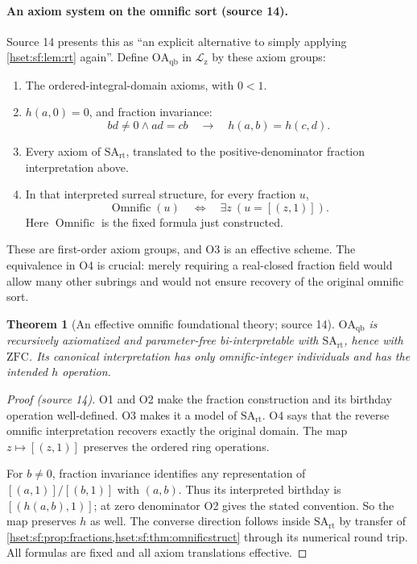 \documentclass[11pt,letterpaper]{article}
\newtheorem{theorem}{Theorem}[section]
\theoremstyle{definition}
\theoremstyle{remark}
\newcommand{\ZFC}{\mathrm{ZFC}}
\newcommand{\Lz}{\mathcal L_{\mathrm z}}
\newcommand{\SArt}{\mathrm{SA}_{\mathrm{rt}}}
\newcommand{\OAqb}{\mathrm{OA}_{\mathrm{qb}}}
\begin{document}
\paragraph{An axiom system on the omnific sort (source 14).} Source 14 presents
this as ``an explicit alternative to simply applying \cref{hset:sf:lem:rt}
again''. Define $\OAqb$ in $\Lz$ by these axiom groups:
\begin{enumerate}[label=\textbf{O\arabic*.}]
\item The ordered-integral-domain axioms, with $0<1$.
\item $h(a,0)=0$, and fraction invariance:
\[
 bd\ne0\land ad=cb\quad\longrightarrow\quad h(a,b)=h(c,d).
\]
\item Every axiom of $\SArt$, translated to the positive-denominator fraction
interpretation above.
\item In that interpreted surreal structure, for every fraction $u$,
\[
 \operatorname{Omnific}(u)\quad\Longleftrightarrow\quad\exists z\ (u=[(z,1)]).
\]
Here $\operatorname{Omnific}$ is the fixed formula just constructed.
\end{enumerate}
These are first-order axiom groups, and O3 is an effective scheme. The equivalence
in O4 is crucial: merely requiring a real-closed fraction field would allow many
other subrings and would not ensure recovery of the original omnific sort.

\begin{theorem}[An effective omnific foundational theory; source 14]\label{hset:sf:thm:omnifictheory}
$\OAqb$ is recursively axiomatized and parameter-free bi-interpretable with
$\SArt$, hence with $\ZFC$. Its canonical interpretation has only omnific-integer
individuals and has the intended $h$ operation.
\end{theorem}
\begin{proof}[Proof (source 14)]
O1 and O2 make the fraction construction and its birthday operation well-defined.
O3 makes it a model of $\SArt$. O4 says that the reverse omnific interpretation
recovers exactly the original domain. The map $z\mapsto[(z,1)]$ preserves the
ordered ring operations.

For $b\ne0$, fraction invariance identifies any representation of
$[(a,1)]/[(b,1)]$ with $(a,b)$. Thus its interpreted birthday is $[(h(a,b),1)]$; at
zero denominator O2 gives the stated convention. So the map preserves $h$ as well.
The converse direction follows inside $\SArt$ by transfer of
\cref{hset:sf:prop:fractions,hset:sf:thm:omnificstruct} through its numerical round
trip. All formulas are fixed and all axiom translations effective.
\end{proof}
\end{document}
